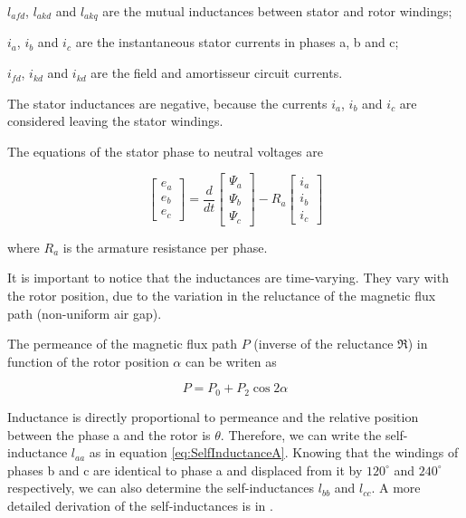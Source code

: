 $l_{afd}$, $l_{akd}$ and $l_{akq}$ are the mutual inductances between stator and rotor windings;

$i_a$, $i_b$ and $i_c$ are the instantaneous stator currents in phases a, b and c;

$i_{fd}$, $i_{kd}$ and $i_{kd}$ are the field and amortisseur circuit currents.

The stator inductances are negative, because the currents $i_a$, $i_b$ and $i_c$ are considered leaving the stator windings.
 
The equations of the stator phase to neutral voltages are

\begin{equation}
	\begin{bmatrix}
		e_a \\
		e_b \\
		e_c
	\end{bmatrix}
	=
	\frac{d}{dt}
	\begin{bmatrix}
		\Psi_a \\
		\Psi_b \\
		\Psi_c
	\end{bmatrix}
	-R_a
	\begin{bmatrix}
		i_a \\
		i_b \\
		i_c
	\end{bmatrix}
\end{equation}

where $R_a$ is the armature resistance per phase.

It is important to notice that the inductances are time-varying. They vary with the rotor position, due to the variation in the reluctance of the magnetic flux path (non-uniform air gap). 

The permeance of the magnetic flux path $P$ (inverse of the reluctance $\Re$) in function of the rotor position $\alpha$ can be writen as

\begin{equation}
	P = P_0 + P_2 \cos 2 \alpha
\end{equation}

Inductance is directly proportional to permeance and the relative position between the phase a and the rotor is $\theta$. Therefore, we can write the self-inductance $l_{aa}$ as in equation \ref{eq:SelfInductanceA}. Knowing that the windings of phases b and c are identical to phase a and displaced from it by  $120^{\circ}$ and $240^{\circ}$ respectively, we can also determine the self-inductances $l_{bb}$ and $l_{cc}$. A more detailed derivation of the self-inductances is in \cite{kundur1994power}.

